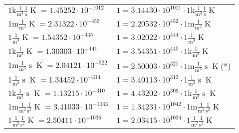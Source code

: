 \begin{center}
\begin{longtable}{l l}
{\color{gray}$1 \bm{\mathrm{ k}}\frac1{\operatorname{m}^3}\frac1{\operatorname{s}}{}{\operatorname{K}} = 1.45252\cdot10^{-1012} $}   & {\color{gray}$ 1 = 3.14430\cdot10^{1011} \cdot 1 \bm{\mathrm{ k}}\frac1{\operatorname{m}^3}\frac1{\operatorname{s}}{}{\operatorname{K}}$}  \\
{\color{gray}$1 \bm{\mathrm{ m}}\frac1{\operatorname{m}^3}{}{}{\operatorname{K}} = 2.31322\cdot10^{-453} $}   & {\color{gray}$ 1 = 2.20532\cdot10^{452} \cdot 1 \bm{\mathrm{ m}}\frac1{\operatorname{m}^3}{}{}{\operatorname{K}}$}  \\
{\color{black}$1 \bm{\mathrm{ }}\frac1{\operatorname{m}^3}{}{}{\operatorname{K}} = 1.54352\cdot10^{-445} $}   & {\color{black}$ 1 = 3.02022\cdot10^{444} \cdot 1 \bm{\mathrm{ }}\frac1{\operatorname{m}^3}{}{}{\operatorname{K}}$}  \\
{\color{gray}$1 \bm{\mathrm{ k}}\frac1{\operatorname{m}^3}{}{}{\operatorname{K}} = 1.30303\cdot10^{-441} $}   & {\color{gray}$ 1 = 3.54351\cdot10^{440} \cdot 1 \bm{\mathrm{ k}}\frac1{\operatorname{m}^3}{}{}{\operatorname{K}}$}  \\
{\color{gray}$1 \bm{\mathrm{ m}}\frac1{\operatorname{m}^3}{\operatorname{s}}{}{\operatorname{K}} = 2.04121\cdot10^{-322} $}   & {\color{gray}$ 1 = 2.50003\cdot10^{321} \cdot 1 \bm{\mathrm{ m}}\frac1{\operatorname{m}^3}{\operatorname{s}}{}{\operatorname{K}}$}\quad(*)\\
{\color{black}$1 \bm{\mathrm{ }}\frac1{\operatorname{m}^3}{\operatorname{s}}{}{\operatorname{K}} = 1.34452\cdot10^{-314} $}   & {\color{black}$ 1 = 3.40113\cdot10^{313} \cdot 1 \bm{\mathrm{ }}\frac1{\operatorname{m}^3}{\operatorname{s}}{}{\operatorname{K}}$}  \\
{\color{gray}$1 \bm{\mathrm{ k}}\frac1{\operatorname{m}^3}{\operatorname{s}}{}{\operatorname{K}} = 1.13215\cdot10^{-310} $}   & {\color{gray}$ 1 = 4.43202\cdot10^{305} \cdot 1 \bm{\mathrm{ k}}\frac1{\operatorname{m}^3}{\operatorname{s}}{}{\operatorname{K}}$}  \\
{\color{gray}$1 \bm{\mathrm{ m}}\frac1{\operatorname{m}^2}\frac1{\operatorname{s}^2}{}{\operatorname{K}} = 3.41033\cdot10^{-1043} $}   & {\color{gray}$ 1 = 1.34231\cdot10^{1042} \cdot 1 \bm{\mathrm{ m}}\frac1{\operatorname{m}^2}\frac1{\operatorname{s}^2}{}{\operatorname{K}}$}  \\
{\color{black}$1 \bm{\mathrm{ }}\frac1{\operatorname{m}^2}\frac1{\operatorname{s}^2}{}{\operatorname{K}} = 2.50411\cdot10^{-1035} $}   & {\color{black}$ 1 = 2.03415\cdot10^{1034} \cdot 1 \bm{\mathrm{ }}\frac1{\operatorname{m}^2}\frac1{\operatorname{s}^2}{}{\operatorname{K}}$}  \\

\end{longtable}
\end{center}
